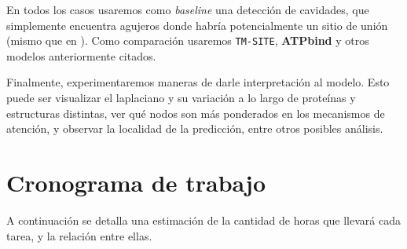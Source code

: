 \documentclass[
    left=2.0cm,         %
    right=2.0cm,        %
    top=2.0cm,          %
    bottom=2.5cm,         %
    bindingoffset=6mm,  %
    nohyphenation=false %
]{eiti/eiti-thesis}
\begin{document}
En todos los casos usaremos como \textit{baseline} una detección de cavidades, que simplemente
encuentra agujeros donde habría potencialmente un sitio de unión (mismo que en \cite{yang2013tmsite}). Como comparación usaremos \texttt{TM-SITE}, \textbf{ATPbind}
y otros modelos anteriormente citados.

Finalmente, experimentaremos maneras de darle interpretación al modelo. Esto puede
ser visualizar el laplaciano y su variación a lo largo de proteínas y estructuras 
distintas,
ver qué nodos son más ponderados en los mecanismos de atención, y observar la localidad
de la predicción, entre otros posibles análisis.


\newpage
\section{Cronograma de trabajo}

A continuación se detalla una estimación de la cantidad de horas que llevará cada tarea,
y la relación entre ellas. 
\end{document}
